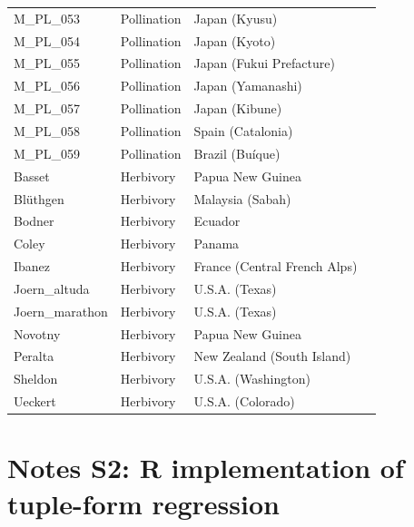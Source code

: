 \documentclass[12pt]{article}
\begin{document}
\begin{spacing}{1.5}
\begin{table}[h!]
\begin{center}
\begin{tabular}{|l l l m{6cm} |}
    M\_PL\_053  & Pollination & Japan (Kyusu) & \citet{Yamazaki2003}  \\
    M\_PL\_054  & Pollination & Japan (Kyoto) & \citet{Kakutani1990}  \\
    M\_PL\_055  & Pollination & Japan (Fukui Prefacture) & \citet{Kato1996}  \\
    M\_PL\_056  & Pollination & Japan (Yamanashi) & \citet{Kato1993}  \\
    M\_PL\_057  & Pollination & Japan (Kibune) & \citet{Inoue1990} \\
    M\_PL\_058  & Pollination & Spain (Catalonia) & \citet{Bartomeus2008} \\
    M\_PL\_059  & Pollination & Brazil (Bu\'{i}que) & \citet{Bezerra2009} \\
    Basset  & Herbivory & Papua New Guinea & \citet{Basset1996}  \\
    Bl\"{u}thgen  & Herbivory & Malaysia (Sabah) & \citet{Bluthgen2006a}  \\
    Bodner  & Herbivory & Ecuador & \citet{Bodner2010}  \\
    Coley & Herbivory & Panama & \citet{Coley2006} \\
    Ibanez  & Herbivory & France (Central French Alps) & \citet{Ibanez2013}  \\
    Joern\_altuda  & Herbivory & U.S.A. (Texas) & \citet{Joern1979} \\
    Joern\_marathon  & Herbivory & U.S.A. (Texas) & \citet{Joern1979} \\
    Novotny & Herbivory & Papua New Guinea & \citet{Novotny2012} \\
    Peralta & Herbivory & New Zealand (South Island) & \citet{Peralta2016} \\
    Sheldon & Herbivory & U.S.A. (Washington) & \citet{Sheldon1978} \\
    Ueckert & Herbivory & U.S.A. (Colorado) & \citet{Ueckert1971} \\
    \hline
    \end{tabular}
    \end{center}
    \end{table}
\clearpage
\newpage

\section*{Notes S2: R implementation of tuple-form regression}


\end{spacing}
\end{document}
